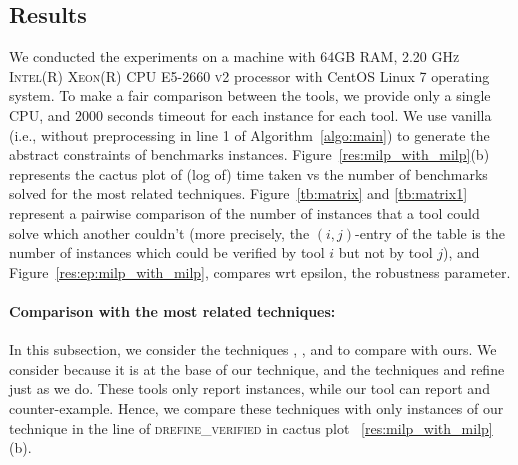 \subsection{Results}
We conducted the experiments on a machine with \textsc{64GB RAM, 2.20 GHz Intel(R) Xeon(R) CPU E5-2660 v2}
processor with CentOS Linux 7 operating system. 
To make a fair comparison between the tools, we provide only a single \textsc{CPU}, and $2000$ seconds timeout for each instance for each tool. 
We use vanilla \deeppoly{} (i.e., \deeppoly{} without preprocessing in line 1 of Algorithm~\ref{algo:main}) 
to generate the abstract constraints of benchmarks instances.
Figure~\ref{res:milp_with_milp}(b) represents the cactus plot of (log of) time taken vs the number of benchmarks 
solved for the most related techniques. Figure~\ref{tb:matrix} and \ref{tb:matrix1} represent a 
pairwise comparison of the number of 
instances that a tool could solve which another couldn't  
(more precisely, the $(i,j)$-entry of the table is the number of instances which could be verified 
by tool $i$ but not by tool $j$), and Figure~\ref{res:ep:milp_with_milp}, compares wrt epsilon, the robustness parameter.






\paragraph{Comparison with the most related techniques:}
In this subsection, we consider the techniques \deeppoly{}, \kpoly{}, and \deepsrgr{} to compare with ours. 
We consider \deeppoly{} because it is at the base of our technique, and the techniques \kpoly{} and \deepsrgr{} refine \deeppoly{} just as we do. These tools only report \verified{} instances, while our tool can report  \verified{} and counter-example. Hence, we compare these techniques with only \verified{}  instances of our technique in the line of \textsc{drefine\_verified} in cactus plot ~\ref{res:milp_with_milp}(b). 

